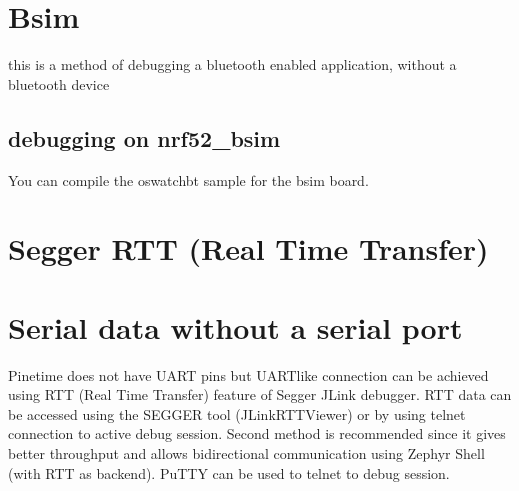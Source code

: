 \documentclass[letterpaper,10pt,english]{sphinxmanual}
\begin{document}
\section{Bsim}
\label{\detokenize{debugging/bsim:bsim}}\label{\detokenize{debugging/bsim::doc}}
this is a method of debugging a bluetooth enabled application, without a bluetooth device


\subsection{debugging on nrf52\_bsim}
\label{\detokenize{debugging/bsim:debugging-on-nrf52-bsim}}
You can compile the oswatch\sphinxhyphen{}bt sample for the bsim board.

\begin{sphinxVerbatim}[commandchars=\\\{\}]
     

 
     
  
\end{sphinxVerbatim}


\section{Segger RTT (Real Time Transfer)}
\label{\detokenize{debugging/jlink:segger-rtt-real-time-transfer}}\label{\detokenize{debugging/jlink::doc}}

\section{Serial data without a serial port}
\label{\detokenize{debugging/jlink:serial-data-without-a-serial-port}}
Pinetime does not have UART pins but UART\sphinxhyphen{}like connection can be achieved using RTT (Real Time Transfer)
feature of Segger JLink debugger. RTT data can be accessed using the SEGGER tool (JLinkRTTViewer) or by using
telnet connection to active debug session. Second method is recommended since it gives better throughput
and allows bidirectional communication using Zephyr Shell (with RTT as backend). PuTTY can be used to
telnet to debug session.
\end{document}
